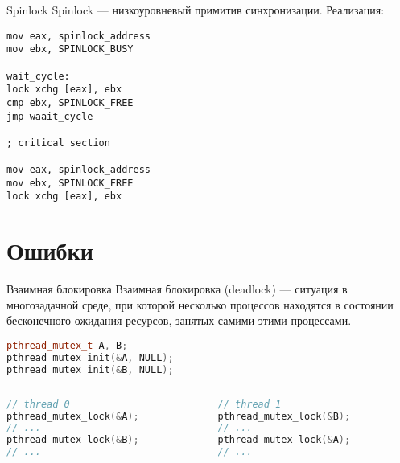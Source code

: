 \begin{frame}[fragile]{Spinlock}
Spinlock --- низкоуровневый примитив синхронизации.
\vfill
Реализация:
\begin{lstlisting}[language={[x86masm]Assembler}, basicstyle=\scriptsize]
mov eax, spinlock_address
mov ebx, SPINLOCK_BUSY

wait_cycle:
lock xchg [eax], ebx
cmp ebx, SPINLOCK_FREE
jmp waait_cycle

; critical section

mov eax, spinlock_address
mov ebx, SPINLOCK_FREE
lock xchg [eax], ebx
\end{lstlisting}
\end{frame}

\section{Ошибки}

\begin{frame}[fragile]{Взаимная блокировка}
Взаимная блокировка (\abbr deadlock) --- ситуация в многозадачной среде, при которой несколько процессов находятся в состоянии бесконечного ожидания ресурсов, занятых самими этими процессами.
\vfill
\begin{lstlisting}[language=C++,basicstyle=\ttfamily,keywordstyle=\color{blue},basicstyle=\footnotesize]
pthread_mutex_t A, B;
pthread_mutex_init(&A, NULL);
pthread_mutex_init(&B, NULL);
\end{lstlisting}

\begin{columns}[t]
    \begin{column}[T]{0.45\textwidth}
        \begin{lstlisting}[language=C++,basicstyle=\ttfamily,keywordstyle=\color{blue},basicstyle=\scriptsize]
// thread 0
pthread_mutex_lock(&A);
// ...
pthread_mutex_lock(&B);
// ...
        \end{lstlisting}
    \end{column}
    \begin{column}[T]{0.45\textwidth}
        \begin{lstlisting}[language=C++,basicstyle=\ttfamily,keywordstyle=\color{blue},basicstyle=\scriptsize]
// thread 1
pthread_mutex_lock(&B);
// ...
pthread_mutex_lock(&A);
// ...
        \end{lstlisting}
    \end{column}
\end{columns}
\end{frame}


